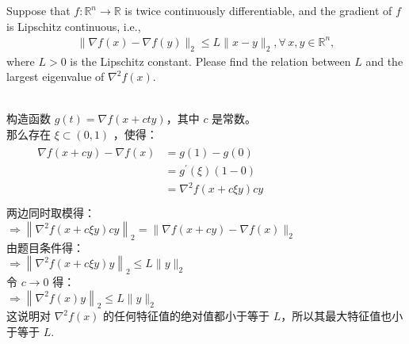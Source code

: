 \documentclass[11pt,letter,notitlepage]{article}
\begin{document}
\begin{exercise}
Suppose that $f:\mathbb{R}^n\rightarrow\mathbb{R}$ is twice continuously differentiable, and the gradient of $f$ is Lipschitz continuous, i.e.,
\begin{align*}
    \|\nabla f(x)-\nabla f(y)\|_2\le L\|x-y\|_2, \forall\,x,y\in\mathbb{R}^n,
\end{align*}
where $L>0$ is the Lipschitz constant. Please find the relation between $L$ and the largest eigenvalue of $\nabla^2 f(x)$.
\end{exercise}
\begin{solution}
    \heiti \ \\
    构造函数 $g(t)= \nabla f(x+c t y)$，其中 $c$ 是常数。\\
    那么存在 $\xi \subset (0,1)$ ，使得：\\
    $\begin{array}{l}{\qquad \begin{aligned}  \nabla f(x+c y)-\nabla f(x) &=g(1)-g(0) \\ &=g^{\prime}\left(\xi \right)(1-0) \\ &=\nabla^{2} f(x+c\xi y)c y \end{aligned}} \\  \end{array}$\\
    两边同时取模得：\\
    $ \Rightarrow \left\|\nabla^{2} f(x+c \xi y) c y\right\|_2 =\|\nabla f(x+c y)-\nabla f(x)\|_2$\\
    由题目条件得：\\
    ${\Rightarrow\left\|\nabla^{2} f(x+c \xi y) y\right\|_2 \leqslant L\|y\|_2}$\\
    令 ${c \rightarrow 0}$ 得：\\
    ${\Rightarrow\left\|\nabla^{2} f(x) y\right\|_2 \leqslant L\|y\|_2}$\\
    这说明对 $\nabla^{2}f(x)$ 的任何特征值的绝对值都小于等于 $L$，所以其最大特征值也小于等于 $L$.
\end{solution}
\newpage
\end{document}

